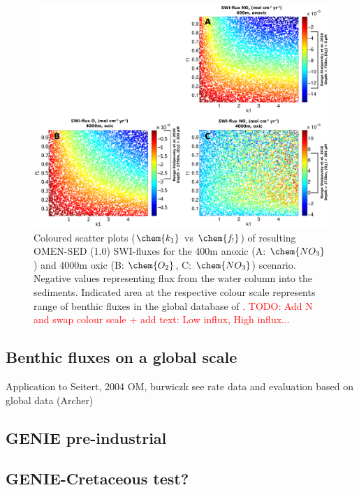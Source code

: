 \documentclass[gmd, manuscript]{copernicus}
\begin{document}
\begin{figure}[htbp]
\begin{center}
	\includegraphics[width=1.0\textwidth]{figures/SA/k1_vs_f1_SWIflux_COMBINED.pdf}
	\caption{Coloured scatter plots ($\chem{k_1}$ vs $\chem{f_!}$) of resulting OMEN-SED (1.0) SWI-fluxes for the 400m anoxic (A: $\chem{NO_3}$) and 4000m oxic (B: $\chem{O_2}$, C: $\chem{NO_3}$) scenario. 
	Negative values representing flux from the water column into the sediments.
	Indicated area at the respective colour scale represents range of benthic fluxes in the global database of \citet{bohlen_simple_2012}. 
	\textcolor{red}{TODO: Add N and swap colour scale + add text: Low influx, High influx...}}
	\label{fig:SA_Color_ScatterPlots}
\end{center}
\end{figure}




\subsection{Benthic fluxes on a global scale}
Application to Seitert, 2004 OM, burwiczk see rate data and evaluation based on global data (Archer)

\subsection{GENIE pre-industrial}\label{subsec:GENIE-pre-ind}

\subsection{GENIE-Cretaceous test?}
\end{document}
